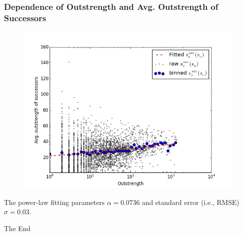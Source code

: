 \documentclass{beamer}
\begin{document}
\begin{frame}
\frametitle{Dependence of Outstrength and Avg. Outstrength of Successors}
\begin{figure}
\includegraphics[width=0.8\linewidth]{figs/suc_out_out_s.png}
\end{figure}
\small{The power-law fitting parameters $\alpha=0.0736$ and standard error (i.e., RMSE) $\sigma=0.03$.}
\end{frame}


\begin{frame}
\Huge{\centerline{The End}}
\end{frame}

\end{document}
